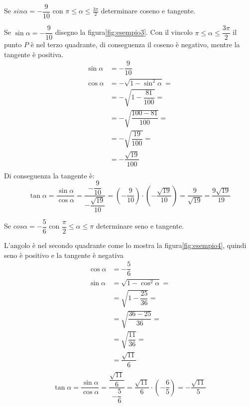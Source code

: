 \begin{esempiot}{}{}
	Se $sin\alpha=-\dfrac{9}{10}$ con $\pi\leq\alpha\leq\frac{3\pi}{2}$ determinare coseno e tangente.
\end{esempiot}
Se $\sin\alpha=-\dfrac{9}{10}$ disegno la figura\nobs\vref{fig:esempio3}. Con il vincolo $\pi\leq\alpha\leq\dfrac{3\pi}{2}$ il punto $P$ è nel terzo quadrante, di conseguenza il coseno è negativo, mentre  la tangente è positiva.
\begin{align*}
\sin\alpha&=-\dfrac{9}{10}\\
\cos\alpha&=-\sqrt{1-\sin^2\alpha}=\\
&=-\sqrt{1-\dfrac{81}{100}}=\\
&=-\sqrt{\dfrac{100-81}{100}}=\\
&=-\sqrt{\dfrac{19}{100}}=\\
&=-\dfrac{\sqrt{19}}{100}\\
\end{align*}
Di conseguenza la tangente è:
\[\tan\alpha=\dfrac{\sin\alpha}{\cos\alpha}=\dfrac{-\dfrac{9}{10}}{-\dfrac{\sqrt{19}}{10}}=\left(-\dfrac{9}{10}\right)\cdot\left(-\dfrac{\sqrt{19}}{10}\right)=\dfrac{9}{\sqrt{19}}=\dfrac{9\sqrt{19}}{19}\]
\begin{esempiot}{}{}
	Se $cos\alpha=-\dfrac{5}{6}$ con $\dfrac{\pi}{2}\leq\alpha\leq \pi$ determinare seno e tangente.
\end{esempiot}
L'angolo è nel secondo quadrante come lo mostra la figura\nobs\vref{fig:esempio4}, quindi seno è positivo e la tangente è negativa
\begin{align*}
\cos\alpha&=-\dfrac{5}{6}\\
\sin\alpha&=\sqrt{1-\cos^2\alpha}=\\
&=\sqrt{1-\dfrac{25}{36}}=\\
&=\sqrt{\dfrac{36-25}{36}}=\\
&=\sqrt{\dfrac{11}{36}}=\\
&=\dfrac{\sqrt{11}}{6}\\
\end{align*}
\[\tan\alpha=\dfrac{\sin\alpha}{\cos\alpha}=\dfrac{\dfrac{\sqrt{11}}{6}}{-\dfrac{5}{6}}=\dfrac{\sqrt{11}}{6}\cdot\left(-\dfrac{6}{5}\right)=-\dfrac{\sqrt{11}}{5}\]
